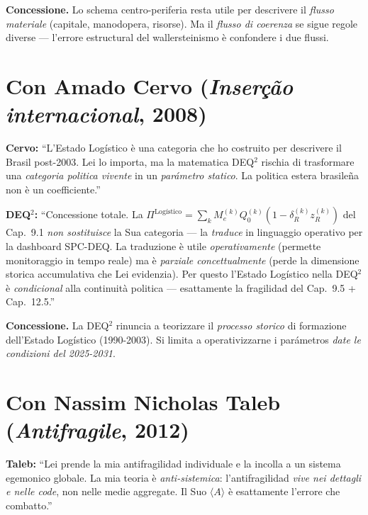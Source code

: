\textbf{Concessione.} Lo schema centro-periferia resta utile per
descrivere il \emph{flusso materiale} (capitale, manodopera, risorse).
Ma il \emph{flusso di coerenza} se sigue regole diverse --- l'errore
estructural del wallersteinismo è confondere i due flussi.



\section{\texorpdfstring{Con Amado Cervo (\emph{Inserção internacional},
2008)}{Con Amado Cervo (Inserção internacional, 2008)}}\label{con-amado-cervo-inseruxe7uxe3o-internacional-2008}

\textbf{Cervo:} ``L'Estado Logístico è una categoria che ho costruito
per descrivere il Brasil post-2003. Lei lo importa, ma la matematica
DEQ$^2$ rischia di trasformare una \emph{categoria politica vivente} in un
\emph{parámetro statico}. La politica estera brasileña non è un
coefficiente.''

\textbf{DEQ$^2$:} ``Concessione totale. La
\(\Pi^{\text{Logístico}} = \sum_k M_e^{(k)} Q_0^{(k)} (1 - \delta_R^{(k)} z_R^{(k)})\)
del Cap.~9.1 \emph{non sostituisce} la Sua categoria --- la
\emph{traduce} in linguaggio operativo per la dashboard SPC-DEQ. La
traduzione è utile \emph{operativamente} (permette monitoraggio in tempo
reale) ma è \emph{parziale concettualmente} (perde la dimensione storica
accumulativa che Lei evidenzia). Per questo l'Estado Logístico nella
DEQ$^2$ è \emph{condicional} alla continuità politica --- esattamente la
fragilidad del Cap.~9.5 + Cap.~12.5.''

\textbf{Concessione.} La DEQ$^2$ rinuncia a teorizzare il \emph{processo
storico} di formazione dell'Estado Logístico (1990-2003). Si limita a
operativizzarne i parámetros \emph{date le condizioni del 2025-2031}.



\section{\texorpdfstring{Con Nassim Nicholas Taleb (\emph{Antifragile},
2012)}{Con Nassim Nicholas Taleb (Antifragile, 2012)}}\label{con-nassim-nicholas-taleb-antifrágil-2012}

\textbf{Taleb:} ``Lei prende la mia antifragilidad individuale e la
incolla a un sistema egemonico globale. La mia teoria è
\emph{anti-sistemica}: l'antifragilidad \emph{vive nei dettagli e nelle
code}, non nelle medie aggregate. Il Suo \(\langle A\rangle\) è
esattamente l'errore che combatto.''

